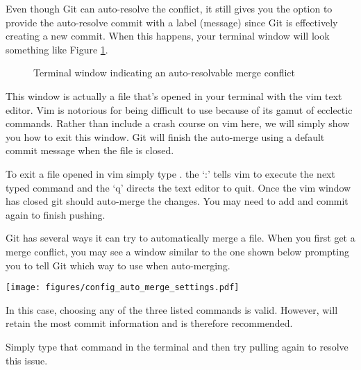 Even though Git can auto-resolve the conflict, it still gives you the option to provide the auto-resolve commit with a label (message) since Git is effectively
creating a new commit. When this happens, your terminal window will look something like Figure \ref{fig:auto_resolve}.


\begin{figure}[h]
    \centering
    \caption{Terminal window indicating an auto-resolvable merge conflict}
    \label{fig:auto_resolve}
\end{figure}

\begin{warn}
    This window is actually a file that's opened in your terminal with the vim text editor. Vim is notorious for being difficult to use because of its
    gamut of ecclectic commands. Rather than include a crash course on vim here, we will simply show you how to exit this window. 
    Git will finish the auto-merge using a default commit message when the file is closed.
\end{warn}

To exit a file opened in vim simply type . the `:' tells vim to execute the next typed command and the `q' directs the text editor to quit. Once the 
vim window has closed git should auto-merge the changes. You may need to add and commit again to finish pushing.

\begin{info}
    Git has several ways it can try to automatically merge a file. When you first get a merge conflict, you may see a window similar to the one shown below 
    prompting you to tell Git which way to use when auto-merging.


    \begin{center}
        \texttt{[image: figures/config\_auto\_merge\_settings.pdf]}
    \end{center}

    In this case, choosing any of the three listed commands is valid. However,  will retain the most commit information and is therefore 
    recommended. 

    Simply type that command in the terminal and then try pulling again to resolve this issue.
\end{info}

